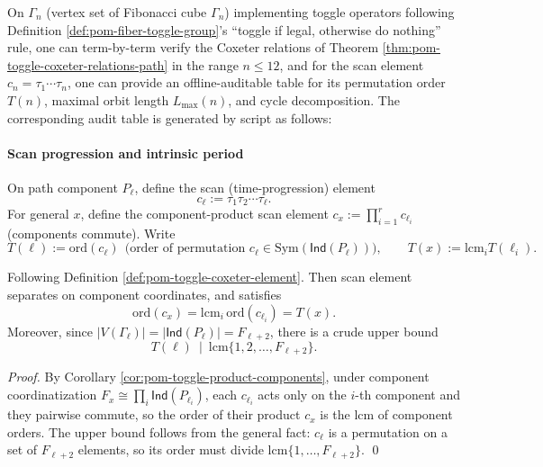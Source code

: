 \begin{remark}\label{rem:pom-toggle-coxeter-audit}
On \(\Gamma_n\) (vertex set of Fibonacci cube \(\Gamma_n\)) implementing toggle operators following Definition \ref{def:pom-fiber-toggle-group}'s ``toggle if legal, otherwise do nothing'' rule,
one can term-by-term verify the Coxeter relations of Theorem \ref{thm:pom-toggle-coxeter-relations-path} in the range \(n\le 12\), and for the scan element \(c_n=\tau_1\cdots\tau_n\), one can provide an offline-auditable table for its permutation order \(T(n)\), maximal orbit length \(L_{\max}(n)\), and cycle decomposition.
The corresponding audit table is generated by script as follows:

\end{remark}

\paragraph{Scan progression and intrinsic period}

\begin{definition}\label{def:pom-toggle-coxeter-element}
On path component \(P_{\ell}\), define the scan (time-progression) element
\[
c_{\ell}:=\tau_1\tau_2\cdots\tau_{\ell}.
\]
For general \(x\), define the component-product scan element
\(
c_x:=\prod_{i=1}^r c_{\ell_i}
\)
(components commute).
\noindent Write
\[
T(\ell):=\mathrm{ord}(c_\ell)\ \ \text{(order of permutation \(c_\ell\in\mathrm{Sym}(\mathsf{Ind}(P_\ell))\))},
\qquad
T(x):=\mathrm{lcm}_{i} T(\ell_i).
\]
\end{definition}

\begin{theorem}\label{thm:pom-toggle-coxeter-order-bound}
Following Definition \ref{def:pom-toggle-coxeter-element}.
Then scan element separates on component coordinates, and satisfies
\[
\mathrm{ord}(c_x)=\mathrm{lcm}_{i}\,\mathrm{ord}(c_{\ell_i})=T(x).
\]
\noindent Moreover, since \(|V(\Gamma_\ell)|=|\mathsf{Ind}(P_\ell)|=F_{\ell+2}\), there is a crude upper bound
\[
T(\ell)\ \mid\ \mathrm{lcm}\{1,2,\dots,F_{\ell+2}\}.
\]
\end{theorem}
\begin{proof}
By Corollary \ref{cor:pom-toggle-product-components}, under component coordinatization \(F_x\cong \prod_i \mathsf{Ind}(P_{\ell_i})\),
each \(c_{\ell_i}\) acts only on the \(i\)-th component and they pairwise commute, so the order of their product \(c_x\) is the lcm of component orders.
The upper bound follows from the general fact: \(c_\ell\) is a permutation on a set of \(F_{\ell+2}\) elements, so its order must divide \(\mathrm{lcm}\{1,\dots,F_{\ell+2}\}\). \qed
\end{proof}

